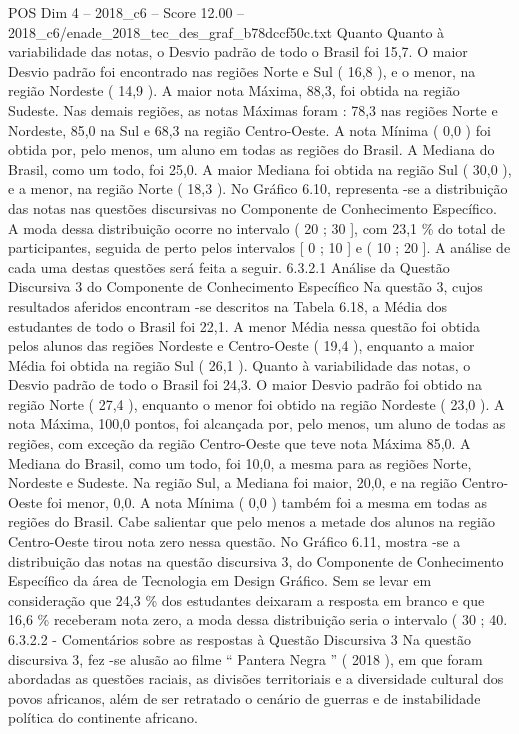 \begin{textsample}{POS Dim 4 – 2018\_c6 – Score 12.00 – 2018\_c6/enade\_2018\_tec\_des\_graf\_b78dccf50c.txt}
Quanto Quanto à variabilidade das notas, o Desvio padrão de todo o Brasil foi 15,7.
O maior Desvio padrão foi encontrado nas regiões Norte e Sul ( 16,8 ), e o menor, na região Nordeste ( 14,9 ).
A maior nota Máxima, 88,3, foi obtida na região Sudeste.
Nas demais regiões, as notas Máximas foram : 78,3 nas regiões Norte e Nordeste, 85,0 na Sul e 68,3 na região Centro-Oeste.
A nota Mínima ( 0,0 ) foi obtida por, pelo menos, um aluno em todas as regiões do Brasil.
A Mediana do Brasil, como um todo, foi 25,0.
A maior Mediana foi obtida na região Sul ( 30,0 ), e a menor, na região Norte ( 18,3 ).
No Gráfico 6.10, representa -se a distribuição das notas nas questões discursivas no Componente de Conhecimento Específico.
A moda dessa distribuição ocorre no intervalo ( 20 ; 30 ], com 23,1 \% do total de participantes, seguida de perto pelos intervalos [ 0 ; 10 ] e ( 10 ; 20 ].
A análise de cada uma destas questões será feita a seguir. 6.3.2.1 Análise da Questão Discursiva 3 do Componente de Conhecimento Específico Na questão 3, cujos resultados aferidos encontram -se descritos na Tabela 6.18, a Média dos estudantes de todo o Brasil foi 22,1.
A menor Média nessa questão foi obtida pelos alunos das regiões Nordeste e Centro-Oeste ( 19,4 ), enquanto a maior Média foi obtida na região Sul ( 26,1 ).
Quanto à variabilidade das notas, o Desvio padrão de todo o Brasil foi 24,3.
O maior Desvio padrão foi obtido na região Norte ( 27,4 ), enquanto o menor foi obtido na região Nordeste ( 23,0 ).
A nota Máxima, 100,0 pontos, foi alcançada por, pelo menos, um aluno de todas as regiões, com exceção da região Centro-Oeste que teve nota Máxima 85,0.
A Mediana do Brasil, como um todo, foi 10,0, a mesma para as regiões Norte, Nordeste e Sudeste.
Na região Sul, a Mediana foi maior, 20,0, e na região Centro-Oeste foi menor, 0,0.
A nota Mínima ( 0,0 ) também foi a mesma em todas as regiões do Brasil.
Cabe salientar que pelo menos a metade dos alunos na região Centro-Oeste tirou nota zero nessa questão.
No Gráfico 6.11, mostra -se a distribuição das notas na questão discursiva 3, do Componente de Conhecimento Específico da área de Tecnologia em Design Gráfico.
Sem se levar em consideração que 24,3 \% dos estudantes deixaram a resposta em branco e que 16,6 \% receberam nota zero, a moda dessa distribuição seria o intervalo ( 30 ; 40. 6.3.2.2 - Comentários sobre as respostas à Questão Discursiva 3 Na questão discursiva 3, fez -se alusão ao filme “ Pantera Negra ” ( 2018 ), em que foram abordadas as questões raciais, as divisões territoriais e a diversidade cultural dos povos africanos, além de ser retratado o cenário de guerras e de instabilidade política do continente africano.

\end{textsample}
